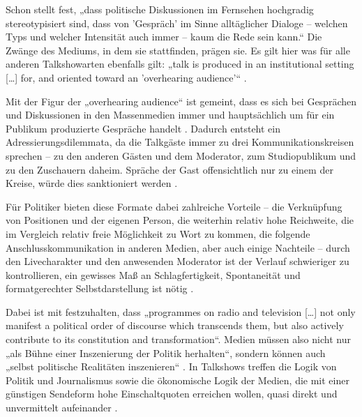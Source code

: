 Schon \textcite[116]{burgerDiskussionOhnRitual1989} stellt fest, „dass politische Diskussionen im Fernsehen hochgradig stereotypisiert sind, dass von 'Gespräch' im Sinne alltäglicher Dialoge – welchen Typs und welcher Intensität auch immer – kaum die Rede sein kann.“ Die Zwänge des Mediums, in dem sie stattfinden, prägen sie. Es gilt hier was für alle anderen Talkshow­arten ebenfalls gilt: „talk is produced in an institutional setting [\ldots] for, and oriented toward an 'overhearing audience'“ \parencite[28]{tolsonTalkingTalkAcademic2001}.

Mit der Figur der „overhearing audience“ ist gemeint, dass es sich bei Gesprächen und Diskussionen in den Massenmedien immer und hauptsächlich um für ein Publikum produzierte Gespräche handelt \parencite[99f., 112-116]{heritageAnalyzingNewsInterviews1989}. Dadurch entsteht ein Adressierungsdilemmata, da die Talkgäste immer zu drei Kommunikationskreisen sprechen – zu den anderen Gästen und dem Moderator, zum Studiopublikum und zu den Zuschauern daheim. Spräche der Gast offensichtlich nur zu einem der Kreise, würde dies sanktioniert werden \parencite[289ff.]{bucherMedienrealitaetPolitischenZur2004}.

Für Politiker bieten diese Formate dabei zahlreiche Vorteile – die Verknüpfung von Positionen und der eigenen Person, die weiterhin relativ hohe Reichweite, die im Vergleich relativ freie Möglichkeit zu Wort zu kommen, die folgende Anschlusskommunikation in anderen Medien, aber auch einige Nachteile – durch den Livecharakter und den anwesenden Moderator ist der Verlauf schwieriger zu kontrollieren, ein gewisses Maß an Schlagfertigkeit, Spontaneität und formatgerechter Selbstdarstellung ist nötig \parencites[326f.]{nielandTalkshowisierungWahlkampfesAnalyse2002}[287]{bucherMedienrealitaetPolitischenZur2004}.

Dabei ist mit \textcite[152]{faircloughPoliticalDiscourseMedia1998} festzuhalten, dass „programmes on radio and television [\ldots] not only manifest a political order of discourse which transcends them, but also actively contribute to its constitution and transformation“. Medien müssen also nicht nur „als Bühne einer Inszenierung der Politik herhalten“, sondern können auch „selbst politische Realitäten inszenieren“ \parencite[271]{bucherMedienrealitaetPolitischenZur2004}. In Talkshows treffen die Logik von Politik und Journalismus sowie die ökonomische Logik der Medien, die mit einer günstigen Sendeform hohe Einschaltquoten erreichen wollen, quasi direkt und unvermittelt aufeinander \parencite[16-20, 41]{bucherLogikPolitikLogik2007}.

